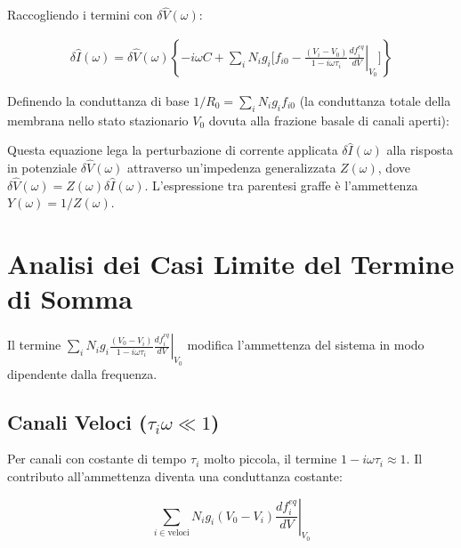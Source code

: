 Raccogliendo i termini con $\delta\hat{V}(\omega)$:

\begin{align} \label{eq:ch20_19}
\delta\hat{I}(\omega) = \delta\hat{V}(\omega) \left\{ -i\omega C + \sum_{i}N_ig_{i} \Bigg[ f_{i0} - \frac{(V_{i}-V_{0})}{1-i\omega\tau_{i}}\left.\frac{df_{i}^{eq}}{dV}\right|_{V_{0}} \Bigg]\right\} 
\end{align}

Definendo la conduttanza di base $1/R_0 = \sum_{i}N_ig_{i}f_{i0}$ (la conduttanza totale della membrana nello stato stazionario $V_0$ dovuta alla frazione basale di canali aperti):

\vspace{0.5cm}
\noindent{}
\vspace{0.5cm}

Questa equazione lega la perturbazione di corrente applicata $\delta\hat{I}(\omega)$ alla risposta in potenziale $\delta\hat{V}(\omega)$ attraverso un'impedenza generalizzata $Z(\omega)$, dove $\delta\hat{V}(\omega) = Z(\omega)\delta\hat{I}(\omega)$.
L'espressione tra parentesi graffe è l'ammettenza $Y(\omega) = 1/Z(\omega)$.


\section{Analisi dei Casi Limite del Termine di Somma}
Il termine $\sum_{i}N_ig_{i}\frac{(V_{0}-V_{i})}{1-i\omega\tau_{i}}\left.\frac{df_{i}^{eq}}{dV}\right|_{V_{0}}$ modifica l'ammettenza del sistema in modo dipendente dalla frequenza.

\subsection*{Canali Veloci ($\tau_i \omega \ll 1$)}
Per canali con costante di tempo $\tau_i$ molto piccola, il termine $1-i\omega\tau_i \approx 1$.
Il contributo all'ammettenza diventa una conduttanza costante:

\begin{equation} \label{eq:ch20_21}
\sum_{i \in \text{veloci}} N_ig_{i}(V_{0}-V_{i})\left.\frac{df_{i}^{eq}}{dV}\right|_{V_{0}}
\end{equation}

